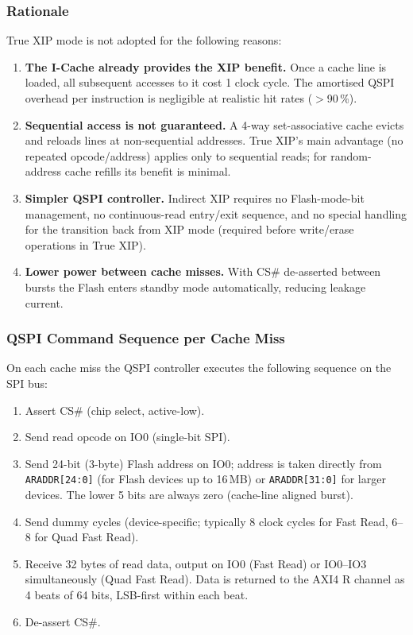 \subsubsection{Rationale}

True XIP mode is not adopted for the following reasons:

\begin{enumerate}
  \item \textbf{The I-Cache already provides the XIP benefit.}
    Once a cache line is loaded, all subsequent accesses to it cost 1
    clock cycle.
    The amortised QSPI overhead per instruction is negligible at
    realistic hit rates ($>$90\,\%).
  \item \textbf{Sequential access is not guaranteed.}
    A 4-way set-associative cache evicts and reloads lines at
    non-sequential addresses.
    True XIP's main advantage (no repeated opcode/address) applies
    only to sequential reads; for random-address cache refills its
    benefit is minimal.
  \item \textbf{Simpler QSPI controller.}
    Indirect XIP requires no Flash-mode-bit management, no
    continuous-read entry/exit sequence, and no special handling for
    the transition back from XIP mode (required before write/erase
    operations in True XIP).
  \item \textbf{Lower power between cache misses.}
    With CS\# de-asserted between bursts the Flash enters standby
    mode automatically, reducing leakage current.
\end{enumerate}

\subsubsection{QSPI Command Sequence per Cache Miss}

On each cache miss the QSPI controller executes the following sequence
on the SPI bus:

\begin{enumerate}
  \item Assert CS\# (chip select, active-low).
  \item Send read opcode on IO0 (single-bit SPI).
  \item Send 24-bit (3-byte) Flash address on IO0; address is taken
    directly from \texttt{ARADDR[24:0]} (for Flash devices up to 16\,MB)
    or \texttt{ARADDR[31:0]} for larger devices.
    The lower 5 bits are always zero (cache-line aligned burst).
  \item Send dummy cycles (device-specific; typically 8 clock cycles
    for Fast Read, 6--8 for Quad Fast Read).
  \item Receive 32 bytes of read data, output on IO0 (Fast Read) or
    IO0--IO3 simultaneously (Quad Fast Read).
    Data is returned to the AXI4 R channel as 4 beats of 64 bits,
    LSB-first within each beat.
  \item De-assert CS\#.
\end{enumerate}

